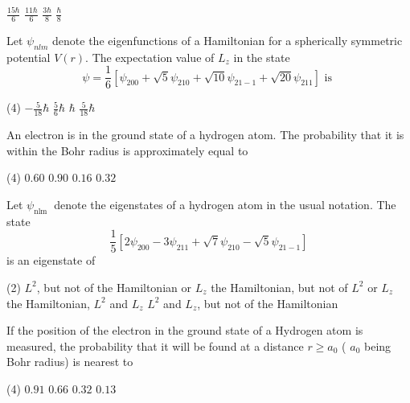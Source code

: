 \begin{enumerate}
\begin{tasks}
	\task[\textbf{A.}] $\frac{15 \hbar}{6}$
	\task[\textbf{B.}]$\frac{11 \hbar}{6}$
	\task[\textbf{C.}]$\frac{3 \hbar}{8}$
	\task[\textbf{D.}]$\frac{\hbar}{8}$
\end{tasks}
\begin{minipage}{\textwidth}
	\item Let $\psi_{n l m}$ denote the eigenfunctions of a Hamiltonian for a spherically symmetric potential $V(r)$. The expectation value of $L_{z}$ in the state
	$$\psi=\frac{1}{6}\left[\psi_{200}+\sqrt{5} \psi_{210}+\sqrt{10} \psi_{21-1}+\sqrt{20} \psi_{211}\right] \text { is }$$
\end{minipage}
\begin{tasks}(4)
	\task[\textbf{A.}] $-\frac{5}{18} \hbar$
	\task[\textbf{B.}]$\frac{5}{6} \hbar$
	\task[\textbf{C.}]$\hbar$
	\task[\textbf{D.}] $\frac{5}{18} \hbar$
\end{tasks}
\begin{minipage}{\textwidth}
	\item An electron is in the ground state of a hydrogen atom. The probability that it is within the Bohr radius is approximately equal to
\end{minipage}
\begin{tasks}(4)
	\task[\textbf{A.}] $0.60$
	\task[\textbf{B.}] $0.90$
	\task[\textbf{C.}]$0.16$
	\task[\textbf{D.}]$0.32$
\end{tasks}
\begin{minipage}{\textwidth}
	\item Let $\psi_{\text {nlm }}$ denote the eigenstates of a hydrogen atom in the usual notation. The state
	$$
	\frac{1}{5}\left[2 \psi_{200}-3 \psi_{211}+\sqrt{7} \psi_{210}-\sqrt{5} \psi_{21-1}\right]
	$$
	is an eigenstate of
\end{minipage}
\begin{tasks}(2)
	\task[\textbf{A.}] $L^{2}$, but not of the Hamiltonian or $L_{z}$
	\task[\textbf{B.}]the Hamiltonian, but not of $L^{2}$ or $L_{z}$
	\task[\textbf{C.}]the Hamiltonian, $L^{2}$ and $L_{z}$
	\task[\textbf{D.}]$L^{2}$ and $L_{z}$, but not of the Hamiltonian
\end{tasks}
\begin{minipage}{\textwidth}
	\item If the position of the electron in the ground state of a Hydrogen atom is measured, the probability that it will be found at a distance $r \geq a_{0}$ ( $a_{0}$ being Bohr radius) is nearest to
\end{minipage}
\begin{tasks}(4)
	\task[\textbf{A.}] $0.91$ 
	\task[\textbf{B.}] $0.66$
	\task[\textbf{C.}] $0.32$
	\task[\textbf{D.}]$0.13$
\end{tasks}
\end{enumerate}

